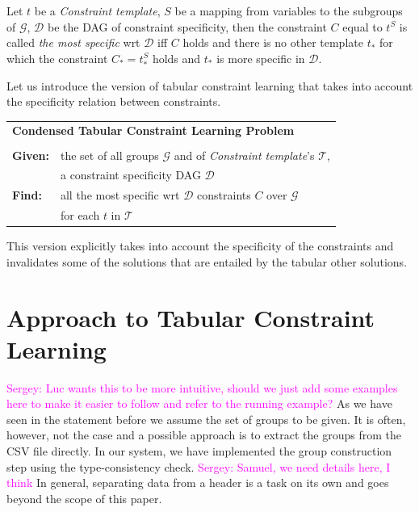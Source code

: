 \documentclass{ecai}
\newcommand{\sergey}[1]{\textcolor{magenta}{{\sc Sergey:} #1}\xspace}
\newcommand{\constraints}{\ensuremath{\mathcal{T}}\xspace}
\newcommand{\format}[1]{\textit{#1}\xspace}
\newcommand{\template}{\format{Constraint template}}
\newcommand{\dependencies}{\ensuremath{\mathcal{D}}\xspace}
\newcommand{\groups}{\ensuremath{\mathcal{G}}\xspace}
\begin{document}
Let $t$ be a \template, $S$ be a mapping from variables to the subgroups of \groups, \dependencies be the DAG of constraint specificity, then the constraint $C$ equal to $t^S$ is called  \textit{the most specific} wrt \dependencies iff $C$ holds and there is no other template $t_{*}$ for which the constraint $C_{*}=t_{*}^S$ holds and $t_{*}$ is more specific in \dependencies.


Let us introduce the version of tabular constraint learning that takes into account the specificity relation between constraints.

\begin{minipage}[c]{14em}
  \vspace{5pt}
  \begin{tabular}{ll}
    \multicolumn{2}{l}{{\textbf{Condensed Tabular Constraint Learning Problem}}}\\
    \vspace{-4pt}
    &\\
    \textbf{Given:}& the set of all groups $\groups$ and of \template's $\constraints$,\\
    & a constraint specificity DAG \dependencies \\
    \textbf{Find:}& all the most specific wrt \dependencies constraints $C$ over \groups\\
    & for each $t$ in \constraints \\
  \end{tabular}
  \vspace{6pt}
\end{minipage}

This version explicitly takes into account the specificity of the constraints and invalidates some of the solutions that are entailed by the tabular other solutions.

\section{Approach to Tabular Constraint Learning}
\sergey{Luc wants this to be more intuitive, should we just add some examples here to make it easier to follow and refer to the running example?}
As we have seen in the statement before we assume the set of groups to be given. It is often, however, not the case and a possible approach is to extract the groups from the CSV file directly. In our system, we have implemented the group construction step using the type-consistency check. \sergey{Samuel, we need details here, I think} In general, separating data from a header is a task on its own  \cite{header} and goes beyond the scope of this paper.
\end{document}
